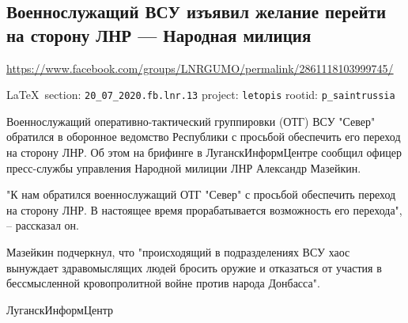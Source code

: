  
 

\subsection{Военнослужащий ВСУ изъявил желание перейти на сторону ЛНР --- Народная милиция}
\url{https://www.facebook.com/groups/LNRGUMO/permalink/2861118103999745/}
  
\vspace{0.5cm}
{\small\LaTeX~section: \verb|20_07_2020.fb.lnr.13| project: \verb|letopis| rootid: \verb|p_saintrussia|}
\vspace{0.5cm}

Военнослужащий оперативно-тактический группировки (ОТГ) ВСУ "Север" обратился в
оборонное ведомство Республики с просьбой обеспечить его переход на сторону
ЛНР. Об этом на брифинге в ЛуганскИнформЦентре сообщил офицер пресс-службы
управления Народной милиции ЛНР Александр Мазейкин.

"К нам обратился военнослужащий ОТГ "Север" с просьбой обеспечить переход на
сторону ЛНР. В настоящее время прорабатывается возможность его перехода", –
рассказал он.

Мазейкин подчеркнул, что "происходящий в подразделениях ВСУ хаос вынуждает
здравомыслящих людей бросить оружие и отказаться от участия в бессмысленной
кровопролитной войне против народа Донбасса".

ЛуганскИнформЦентр
  
